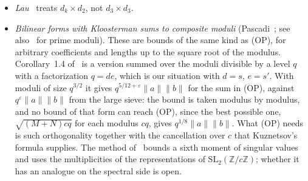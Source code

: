 \documentclass[11pt]{amsart}
\theoremstyle{definition}
\theoremstyle{remark}
\numberwithin{equation}{section}
\newcommand{\Z}{\mathbb Z}
\newcommand{\eps}{\varepsilon}
\begin{document}
\begin{itemize}
has determinant $q$.  The hypotheses hold, but the bound is for the whole
sum over $d\le L^2$ and exceeds the main term for a single $d$.  Their
saving comes from averaging over $d$ with $h$ fixed; (F8) has one $d$ for
each $h$ and an average over $h$.
\item \emph{Lau}~\cite{Lau} treats $d_k\times d_2$, not $d_3\times d_3$.
\item \emph{Bilinear forms with Kloosterman sums to composite moduli}
(Pascadi~\cite{Pas25b}; see also~\cite{KMS} for prime moduli).  These are
bounds of the same kind as (OP), for arbitrary coefficients and lengths up
to the square root of the modulus.  Corollary~1.4 of~\cite{Pas25b} is a
version summed over the moduli divisible by a level $q$ with a factorization
$q=de$, which is our situation with $d=s$, $e=s'$.  With moduli of size
$q^{3/2}$ it gives $q^{5/12+\eps}\|a\|\|b\|$ for the sum in (OP), against
$q^{\eps}\|a\|\|b\|$ from the large sieve: the bound is taken modulus by
modulus, and no bound of that form can reach (OP), since the best possible
one, $\sqrt{(M+N)cq}$ for each modulus $cq$, gives $q^{1/8}\|a\|\|b\|$.
What (OP) needs is such orthogonality together with the cancellation over
$c$ that Kuznetsov's formula supplies.  The method of~\cite{Pas25b} bounds a
sixth moment of singular values and uses the multiplicities of the
representations of $\mathrm{SL}_2(\Z/c\Z)$; whether it has an analogue on
the spectral side is open.
\end{itemize}
\end{document}
